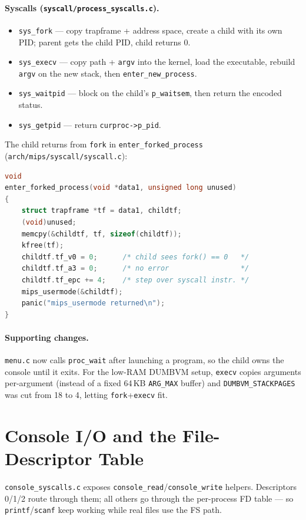 \documentclass[11pt,a4paper]{article}
\begin{document}
\paragraph{Syscalls (\texttt{syscall/process\_syscalls.c}).}
\begin{itemize}[leftmargin=1.4em]
  \item \texttt{sys\_fork} --- copy trapframe + address space, create a child
        with its own PID; parent gets the child PID, child returns 0.
  \item \texttt{sys\_execv} --- copy path + \texttt{argv} into the kernel, load
        the executable, rebuild \texttt{argv} on the new stack, then
        \texttt{enter\_new\_process}.
  \item \texttt{sys\_waitpid} --- block on the child's \texttt{p\_waitsem}, then
        return the encoded status.
  \item \texttt{sys\_getpid} --- return \texttt{curproc->p\_pid}.
\end{itemize}

The child returns from \texttt{fork} in \texttt{enter\_forked\_process}
(\texttt{arch/mips/syscall/syscall.c}):

\begin{lstlisting}[language=C,caption={Forked-child return: v0 = 0, then step past the syscall.}]
void
enter_forked_process(void *data1, unsigned long unused)
{
    struct trapframe *tf = data1, childtf;
    (void)unused;
    memcpy(&childtf, tf, sizeof(childtf));
    kfree(tf);
    childtf.tf_v0 = 0;      /* child sees fork() == 0   */
    childtf.tf_a3 = 0;      /* no error                 */
    childtf.tf_epc += 4;    /* step over syscall instr. */
    mips_usermode(&childtf);
    panic("mips_usermode returned\n");
}
\end{lstlisting}

\paragraph{Supporting changes.}
\texttt{menu.c} now calls \texttt{proc\_wait} after launching a program, so the
child owns the console until it exits. For the low-RAM DUMBVM setup,
\texttt{execv} copies arguments per-argument (instead of a fixed 64\,KB
\texttt{ARG\_MAX} buffer) and \texttt{DUMBVM\_STACKPAGES} was cut from 18 to 4,
letting \texttt{fork}+\texttt{execv} fit.

\FloatBarrier
\section{Console I/O and the File-Descriptor Table}
\texttt{console\_syscalls.c} exposes \texttt{console\_read}/\texttt{console\_write}
helpers. Descriptors 0/1/2 route through them; all others go through the
per-process FD table --- so \texttt{printf}/\texttt{scanf} keep working while
real files use the FS path.
\end{document}
